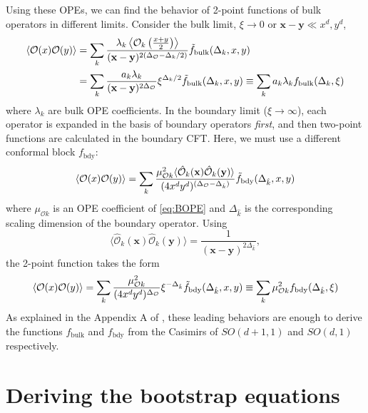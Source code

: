 \documentclass[a4paper,11pt]{article}
\begin{document}
Using these OPEs, we can find the behavior of 2-point functions of bulk operators in different limits. Consider the bulk limit, $\xi \rightarrow 0$ or $\textbf{x} - \textbf{y} \ll x^d, y^d$,
\begin{align}
    \langle \mathcal{O}(x)\mathcal{O}(y)\rangle &= \sum_k \frac{\lambda_{k}\left\langle\mathcal{O}_k\left(\frac{x + y}{2}\right)\right\rangle}{(\textbf{x} - \textbf{y})^{2\left(\Delta_{\mathcal{O}} - \Delta_k/2\right)}}\Tilde{f}_{\textrm{bulk}}(\Delta_k, x, y) \\
    &= \sum_k \frac{a_k\lambda_{k}}{(\textbf{x} - \textbf{y})^{2\Delta_{\mathcal{O}}}}\xi^{\Delta_k/2}\Tilde{f}_{\textrm{bulk}}(\Delta_k, x, y) \equiv \sum_k a_k\lambda_kf_{\textrm{bulk}}(\Delta_k, \xi)
\end{align}
where $\lambda_k$ are bulk OPE coefficients. In the boundary limit ($\xi \rightarrow \infty$), each operator is expanded in the basis of boundary operators \textit{first}, and then two-point functions are calculated in the boundary CFT. Here, we must use a different conformal block $f_{\textrm{bdy}}$:
\begin{equation}
    \langle \mathcal{O}(x)\mathcal{O}(y)\rangle = \sum_k \frac{\mu_{\mathcal{O}k}^2\langle\hat{\mathcal{O}}_k(\textbf{x})\hat{\mathcal{O}}_k(\textbf{y})\rangle}{(4x^dy^d)^{(\Delta_{\mathcal{O}} - \Delta_{\hat{k}})}}\Tilde{f}_{\textrm{bdy}}(\Delta_{\hat{k}}, x, y)
\end{equation}
where $\mu_{\mathcal{O}k}$ is an OPE coefficient of \ref{eq:BOPE} and $\Delta_{\hat{k}}$ is the corresponding scaling dimension of the boundary operator. Using
\begin{equation}
    \langle\hat{\mathcal{O}}_k(\textbf{x})\hat{\mathcal{O}}_k(\textbf{y})\rangle = \frac{1}{(\textbf{x} - \textbf{y})^{2\Delta_{\hat{k}}}},
\end{equation}
the 2-point function takes the form
\begin{equation}
    \langle \mathcal{O}(x)\mathcal{O}(y) \rangle =  \sum_k \frac{\mu_{\mathcal{O}k}^2}{(4x^dy^d)^{\Delta_{\mathcal{O}}}}\xi^{-\Delta_{\hat{k}}}\Tilde{f}_{\textrm{bdy}}(\Delta_{\hat{k}}, x, y) \equiv \sum_k \mu_{\mathcal{O}k}^2f_{\textrm{bdy}}(\Delta_{\hat{k}}, \xi)
\end{equation}
As explained in the Appendix A of \cite{Liendo}, these leading behaviors are enough to derive the functions $f_{\textrm{bulk}}$ and $f_{\textrm{bdy}}$ from the Casimirs of $SO(d+1, 1)$ and $SO(d,1)$ respectively. 

\section{Deriving the bootstrap equations}
\end{document}
